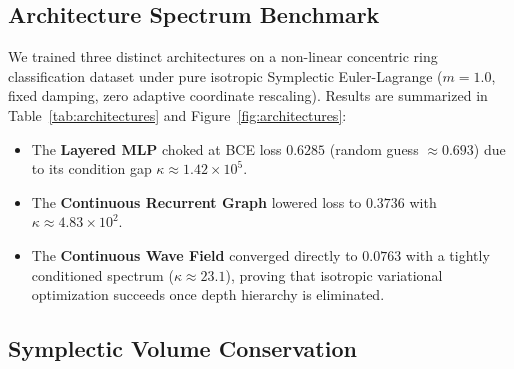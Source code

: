\documentclass[10pt,twocolumn]{article}
\begin{document}
\newpage

\subsection{Architecture Spectrum Benchmark}

We trained three distinct architectures on a non-linear concentric ring classification dataset under pure isotropic Symplectic Euler-Lagrange ($m=1.0$, fixed damping, zero adaptive coordinate rescaling). Results are summarized in Table~\ref{tab:architectures} and Figure~\ref{fig:architectures}:

\begin{table}[h!]
\centering
\small
\caption{\textbf{Architecture Conditioning and Dynamics} (400 Epochs).}
\vspace{2mm}
\label{tab:architectures}
\end{table}

\begin{itemize}
    \item The \textbf{Layered MLP} choked at BCE loss $0.6285$ (random guess $\approx 0.693$) due to its condition gap $\kappa \approx 1.42 \times 10^5$.
    \item The \textbf{Continuous Recurrent Graph} lowered loss to $0.3736$ with $\kappa \approx 4.83 \times 10^2$.
    \item The \textbf{Continuous Wave Field} converged directly to $\mathbf{0.0763}$ with a tightly conditioned spectrum ($\kappa \approx 23.1$), proving that isotropic variational optimization succeeds once depth hierarchy is eliminated.
\end{itemize}

\newpage

\subsection{Symplectic Volume Conservation}
\end{document}
